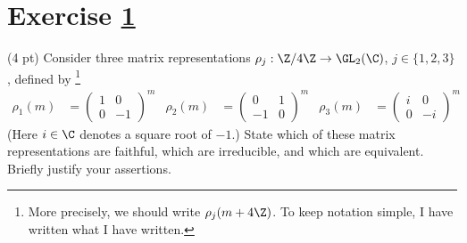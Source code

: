 \spaceSolution{6in}{%
}%



\section{Exercise \ref{sec : me01q5}}
\label{sec : me01q5}

(4 pt) Consider three matrix representations $\rho_{j} : \Z / 4 \Z \rightarrow \GL_{2}(\C)$, $j \in \{1, 2, 3\}$, defined by%
\footnote{More precisely, we should write $\rho_{j}(m + 4 \Z)$. To keep notation simple, I have written what I have written.}%
\begin{align*}
\rho_{1}(m)
&=
\begin{pmatrix}
1	&	0	\\
0	&	-1
\end{pmatrix}%
^{m}
&
\rho_{2}(m)
&=
\begin{pmatrix}
0	&	1	\\
-1	&	0
\end{pmatrix}%
^{m}
&
\rho_{3}(m)
&=
\begin{pmatrix}
i	&	0	\\
0	&	-i
\end{pmatrix}%
^{m}
\end{align*}
(Here $i \in \C$ denotes a square root of $-1$.) State which of these matrix representations are faithful, which are irreducible, and which are equivalent. Briefly justify your assertions.

\spaceSolution{6in}{%
}%